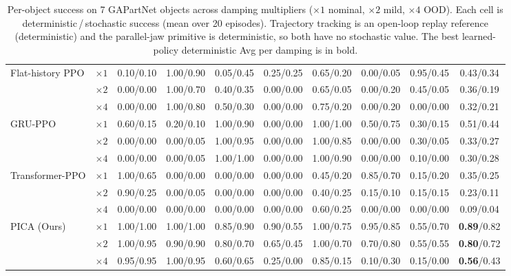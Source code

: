 \documentclass{llmxive}
\begin{document}
\begin{table}[t]
{\begin{tabular}{llcccccccc}
\midrule
\multirow{3}{*}{Flat-history PPO} & $\times1$ & 0.10/0.10 & 1.00/0.90 & 0.05/0.45 & 0.25/0.25 & 0.65/0.20 & 0.00/0.05 & 0.95/0.45 & 0.43/0.34 \\
 & $\times2$ & 0.00/0.00 & 1.00/0.70 & 0.40/0.35 & 0.00/0.00 & 0.65/0.05 & 0.00/0.20 & 0.45/0.05 & 0.36/0.19 \\
 & $\times4$ & 0.00/0.00 & 1.00/0.80 & 0.50/0.30 & 0.00/0.00 & 0.75/0.20 & 0.00/0.20 & 0.00/0.00 & 0.32/0.21 \\
\midrule
\multirow{3}{*}{GRU-PPO} & $\times1$ & 0.60/0.15 & 0.20/0.10 & 1.00/0.90 & 0.00/0.00 & 1.00/1.00 & 0.50/0.75 & 0.30/0.15 & 0.51/0.44 \\
 & $\times2$ & 0.00/0.00 & 0.00/0.05 & 1.00/0.95 & 0.00/0.00 & 1.00/0.85 & 0.00/0.00 & 0.30/0.05 & 0.33/0.27 \\
 & $\times4$ & 0.00/0.00 & 0.00/0.05 & 1.00/1.00 & 0.00/0.00 & 1.00/0.90 & 0.00/0.00 & 0.10/0.00 & 0.30/0.28 \\
\midrule
\multirow{3}{*}{Transformer-PPO} & $\times1$ & 1.00/0.65 & 0.00/0.00 & 0.00/0.00 & 0.00/0.00 & 0.45/0.20 & 0.85/0.70 & 0.15/0.20 & 0.35/0.25 \\
 & $\times2$ & 0.90/0.25 & 0.00/0.05 & 0.00/0.00 & 0.00/0.00 & 0.40/0.25 & 0.15/0.10 & 0.15/0.15 & 0.23/0.11 \\
 & $\times4$ & 0.00/0.00 & 0.00/0.00 & 0.00/0.00 & 0.00/0.00 & 0.60/0.25 & 0.00/0.00 & 0.00/0.00 & 0.09/0.04 \\
\midrule
\multirow{3}{*}{PICA (Ours)} & $\times1$ & 1.00/1.00 & 1.00/1.00 & 0.85/0.90 & 0.90/0.55 & 1.00/0.75 & 0.95/0.85 & 0.55/0.70 & \textbf{0.89}/0.82 \\
 & $\times2$ & 1.00/0.95 & 0.90/0.90 & 0.80/0.70 & 0.65/0.45 & 1.00/0.70 & 0.70/0.80 & 0.55/0.55 & \textbf{0.80}/0.72 \\
 & $\times4$ & 0.95/0.95 & 1.00/0.95 & 0.60/0.65 & 0.25/0.00 & 0.85/0.15 & 0.10/0.30 & 0.15/0.00 & \textbf{0.56}/0.43 \\
\bottomrule
\end{tabular}}
\caption{Per-object success on 7 GAPartNet objects across damping multipliers ($\times1$ nominal, $\times2$ mild, $\times4$ OOD). Each cell is deterministic\,/\,stochastic success (mean over 20 episodes). Trajectory tracking is an open-loop replay reference (deterministic) and the parallel-jaw primitive is deterministic, so both have no stochastic value. The best learned-policy deterministic Avg per damping is in bold.}
\label{tab:main_comparison}
\end{table}
\end{document}
